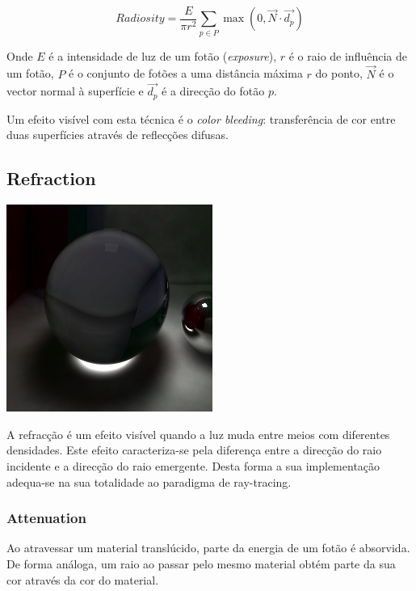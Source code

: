 \documentclass[a4paper]{article}
\begin{document}
\begin{displaymath}
	Radiosity = \frac{E}{\pi r^{2}} \sum \limits_{p \in P}{\max(0, \vec{N} \cdot \vec{d_{p}})}
\end{displaymath}

\indent Onde $E$ é a intensidade de luz de um fotão (\emph{exposure}), $r$ é o raio de influência de um fotão,
$P$ é o conjunto de fotões a uma distância máxima $r$ do ponto, $\vec{N}$ é o vector normal à superfície
e $\vec{d_{p}}$ é a direcção do fotão $p$. 

\indent Um efeito visível com esta técnica é o \emph{color bleeding}: transferência de cor entre duas superfícies
através de reflecções difusas.

\cleardoublepage
\subsection{Refraction}
\begin{center}
	\includegraphics[scale=0.50]{images/caustics.png}
	\label{fig:caustics}
\end{center}

\indent A refracção é um efeito visível quando a luz muda entre meios com diferentes densidades.
Este efeito caracteriza-se pela diferença entre a direcção do raio incidente e a direcção do raio emergente. 
Desta forma a sua implementação adequa-se na sua totalidade ao paradigma de ray-tracing.

\subsubsection{Attenuation}
\indent \indent Ao atravessar um material translúcido, parte da energia de um fotão é absorvida. De forma análoga,
um raio ao passar pelo mesmo material obtém parte da sua cor através da cor do material.
\end{document}
